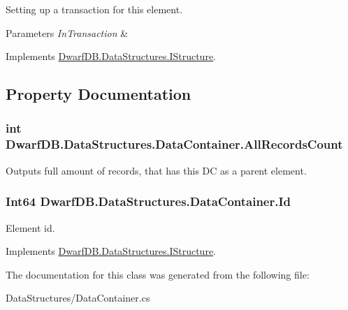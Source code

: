 Setting up a transaction for this element. 


\begin{DoxyParams}{Parameters}
{\em InTransaction} & \\
\hline
\end{DoxyParams}


Implements \hyperlink{interface_dwarf_d_b_1_1_data_structures_1_1_i_structure_aa89d0ecc5915538b89865bc3086d8b0a}{DwarfDB.DataStructures.IStructure}.



\subsection{Property Documentation}
\hypertarget{class_dwarf_d_b_1_1_data_structures_1_1_data_container_af2f2d766cbb2729f91effb3c68fd97e0}{
\subsubsection[{AllRecordsCount}]{\setlength{\rightskip}{0pt plus 5cm}int DwarfDB.DataStructures.DataContainer.AllRecordsCount}}
\label{class_dwarf_d_b_1_1_data_structures_1_1_data_container_af2f2d766cbb2729f91effb3c68fd97e0}


Outputs full amount of records, that has this DC as a parent element. 

\hypertarget{class_dwarf_d_b_1_1_data_structures_1_1_data_container_a3749f4fe324b56d46caf071488c615d7}{
\subsubsection[{Id}]{\setlength{\rightskip}{0pt plus 5cm}Int64 DwarfDB.DataStructures.DataContainer.Id}}
\label{class_dwarf_d_b_1_1_data_structures_1_1_data_container_a3749f4fe324b56d46caf071488c615d7}


Element id. 



Implements \hyperlink{interface_dwarf_d_b_1_1_data_structures_1_1_i_structure_a20776b8ffebc8d77080ef4b9e9817e85}{DwarfDB.DataStructures.IStructure}.



The documentation for this class was generated from the following file:\begin{DoxyCompactItemize}
\item 
DataStructures/DataContainer.cs\end{DoxyCompactItemize}
